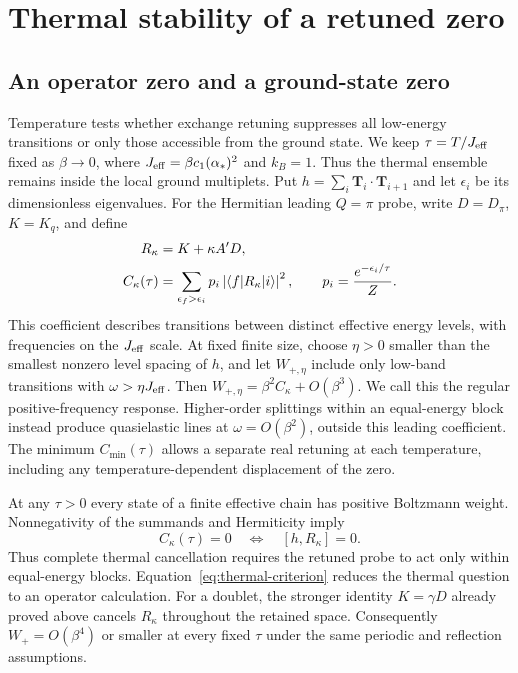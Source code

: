 \section{Thermal stability of a retuned zero}
\label{sec:thermal}

\subsection{An operator zero and a ground-state zero}

Temperature tests whether exchange retuning suppresses all low-energy
transitions or only those accessible from the ground state.
We keep $\tau=T/J_{\rm eff}$ fixed as
$\beta\to0$, where $J_{\rm eff}=\beta c_1(\alpha_*)^2$ and $k_B=1$.
Thus the thermal ensemble remains inside the local ground multiplets.
Put $h=\sum_i\bm T_i\cdot\bm T_{i+1}$ and let $\epsilon_i$ be its
dimensionless eigenvalues. For the Hermitian leading $Q=\pi$ probe,
write $D=D_\pi$, $K=K_q$, and define
\begin{align}
 R_\kappa&=K+\kappa A'D,\notag\\
 C_\kappa(\tau)&=\sum_{\epsilon_f>\epsilon_i}
 p_i\left|\langle f|R_\kappa|i\rangle\right|^2,
 \qquad p_i=\frac{e^{-\epsilon_i/\tau}}{Z}.
 \label{eq:thermal-weight}
\end{align}
This coefficient describes transitions between distinct effective energy
levels, with frequencies on the $J_{\rm eff}$ scale.
At fixed finite size, choose $\eta>0$ smaller than
the smallest nonzero level spacing of $h$, and let $W_{+,\eta}$ include
only low-band transitions with $\omega>\eta J_{\rm eff}$. Then
$W_{+,\eta}=\beta^2C_\kappa+O(\beta^3)$.
We call this the regular positive-frequency response.
Higher-order splittings within an equal-energy block instead produce
quasielastic lines at $\omega=O(\beta^2)$, outside this leading coefficient.
The minimum $C_{\min}(\tau)$ allows a separate real retuning at each
temperature, including any temperature-dependent displacement of the zero.

At any $\tau>0$ every state of a finite effective chain has positive
Boltzmann weight. Nonnegativity of the summands and Hermiticity imply
\begin{equation}
 C_\kappa(\tau)=0\quad\Longleftrightarrow\quad[h,R_\kappa]=0.
 \label{eq:thermal-criterion}
\end{equation}
Thus complete thermal cancellation requires the retuned probe to act
only within equal-energy blocks. Equation~\eqref{eq:thermal-criterion}
reduces the thermal question to an operator calculation.
For a doublet, the stronger identity
$K=\gamma D$ already proved above cancels $R_\kappa$ throughout the
retained space. Consequently $W_+=O(\beta^4)$ or smaller at every fixed
$\tau$ under the same periodic and reflection assumptions.

